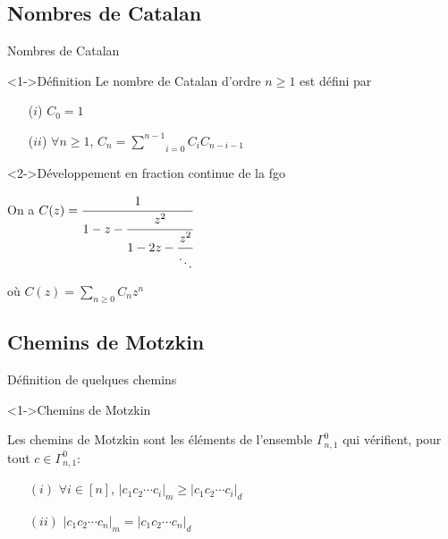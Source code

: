\subsection{Nombres de Catalan}
\begin{frame}{Nombres de Catalan}
    \transfade
    \begin{block}<1->{Définition}
        Le nombre de Catalan d'ordre $n\geq 1$ est défini par \\
        \begin{rm}
            \begin{itemize}
                \item [($i$)] $C_{0}=1$
                \item [($ii$)] $\forall n \geq 1$, $C_{n} = \underset{i=0}{\overset{n-1}{\sum}}C_{i}C_{n-i-1}$
            \end{itemize}
        \end{rm}
    \end{block}

    \begin{block}<2->{Développement en fraction continue de la fgo}
        \begin{rm}
            On a $C(z) = \cfrac{1}{1-z-\cfrac{z^2}{1-2z-\cfrac{z^2}{\ddots}}} $\\
        \end{rm}
        où $C(z)=\sum\limits_{n\geq 0}C_{n}z^{n}$
    \end{block}
\end{frame}



\subsection{Chemins de Motzkin}
\begin{frame}{Définition de quelques chemins}
    \transfade
    \begin{block}<1->{Chemins de Motzkin}
        \begin{rm}
            Les chemins de Motzkin sont les éléments de l'ensemble $\Gamma_{n,1}^{0}$ qui vérifient, pour tout $c \in \Gamma_{n,1}^{0}$:
            \begin{itemize}
                \item[$(i)$] $\forall i \in [n]$, $|c_{1}c_{2}\cdots c_{i}|_{m} \geq |c_{1}c_{2}\cdots c_{i}|_{d} $
                \item[$(ii)$] $|c_{1}c_{2}\cdots c_{n}|_{m} = |c_{1}c_{2}\cdots c_{n}|_{d} $
            \end{itemize}
        \end{rm}
    \end{block}
    
\end{frame}

